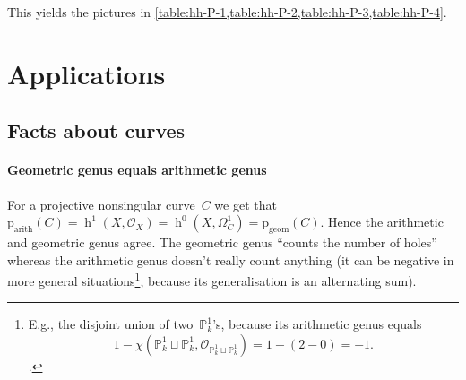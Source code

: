 \documentclass[10pt,a4paper]{article}
\theoremstyle{lecture}
\DeclareMathOperator\hh{h}
\begin{document}
This yields the pictures in \cref{table:hh-P-1,table:hh-P-2,table:hh-P-3,table:hh-P-4}.
\begin{table}
  \centering
  
  \caption{$\hh^i(\mathbb{P}_k^1,\mathcal{O}_{\mathbb{P}_k^1}(r))$}
  \label{table:hh-P-1}
\end{table}

\begin{table}
  \centering
  
  \caption{$\hh^i(\mathbb{P}_k^2,\mathcal{O}_{\mathbb{P}_k^2}(r))$}
  \label{table:hh-P-2}
\end{table}

\begin{table}
  \centering
  
  \caption{$\hh^i(\mathbb{P}_k^3,\mathcal{O}_{\mathbb{P}_k^3}(r))$}
  \label{table:hh-P-3}
\end{table}

\begin{table}
  \centering
  
  \caption{$\hh^i(\mathbb{P}_k^4,\mathcal{O}_{\mathbb{P}_k^4}(r))$}
  \label{table:hh-P-4}
\end{table}

\section{Applications}
\label{section:applications}

\subsection{Facts about curves}
\label{subsection:facts-curves}
\paragraph{Geometric genus equals arithmetic genus}
For a projective nonsingular curve~$C$ we get that~$\mathrm{p}_{\mathrm{arith}}(C)=\hh^1(X,\mathcal{O}_X)=\hh^0(X,\Omega_C^1)=\mathrm{p}_{\mathrm{geom}}(C)$. Hence the arithmetic and geometric genus agree. The geometric genus ``counts the number of holes'' whereas the arithmetic genus doesn't really count anything (it can be negative in more general situations\footnote{E.g., the disjoint union of two~$\mathbb{P}_k^1$'s, because its arithmetic genus equals\begin{equation}1-\chi(\mathbb{P}_k^1\sqcup\mathbb{P}_k^1,\mathcal{O}_{\mathbb{P}_k^1\sqcup\mathbb{P}_k^1})=1-(2-0)=-1.\end{equation}.}, because its generalisation is an alternating sum).
\end{document}

